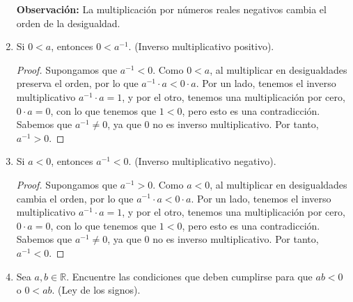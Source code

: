 \documentclass[11pt]{article}
\newcommand{\R}{\mathbb{R}}
\begin{document}
\begin{enumerate}[label=\alph*)]
    \textbf{Observación:} La multiplicación por números reales negativos cambia el orden de la desigualdad.

    \item Si $0<a$, entonces $0<a^{-1}$. (Inverso multiplicativo positivo).
    \vspace{-1em}\begin{proof} 
    Supongamos que $a^{-1}<0$. Como $0<a$, al multiplicar en desigualdades preserva el orden, por lo que $a^{-1} \cdot a<0 \cdot a$. Por un lado, tenemos el inverso multiplicativo $a^{-1} \cdot a = 1$, y por el otro, tenemos una multiplicación por cero, $0\cdot a=0$, con lo que tenemos que $1<0$, pero esto es una contradicción. Sabemos que $a^{-1}\neq 0$, ya que $0$ no es inverso multiplicativo. Por tanto, $a^{-1}>0$.
    \end{proof} \vspace{-1em}

    \item Si $a<0$, entonces $a^{-1}<0$. (Inverso multiplicativo negativo).
    \vspace{-1em}\begin{proof} 
        Supongamos que $a^{-1}>0$. Como $a<0$, al multiplicar en desigualdades cambia el orden, por lo que $a^{-1} \cdot a < 0 \cdot a$. Por un lado, tenemos el inverso multiplicativo $a^{-1}\cdot a =1$, y por el otro, tenemos una multiplicación por cero, $0\cdot a =0$, con lo que tenemos que $1<0$, pero esto es una contradicción. Sabemos que $a^{-1}\neq 0$, ya que $0$ no es inverso multiplicativo. Por tanto, $a^{-1}<0$.
    \end{proof} \vspace{-1em}

    \item Sea $a,b\in \R$. Encuentre las condiciones que deben cumplirse para que $ab<0$ o $0<ab$. (Ley de los signos).
    

\end{enumerate}
\end{document}
